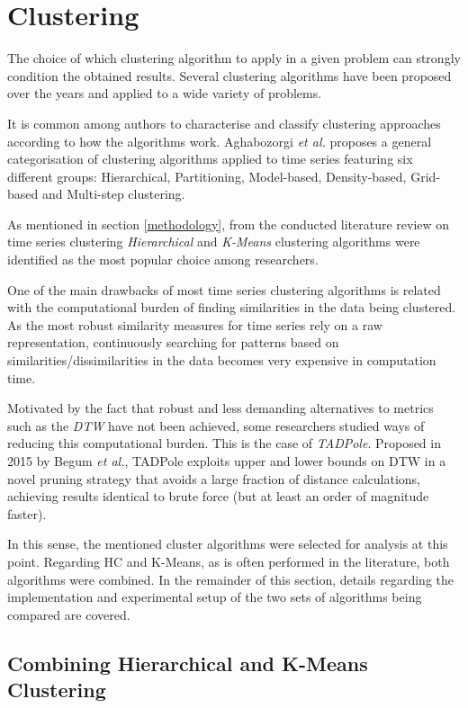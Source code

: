 \documentclass[9pt,journal,compsoc]{IEEEtran}
\begin{document}
\section{Clustering}

The choice of which clustering algorithm to apply in a given problem can strongly condition the obtained results. Several clustering algorithms have been proposed over the years and applied to a wide variety of problems.

It is common among authors to characterise and classify clustering approaches according to how the algorithms work. Aghabozorgi \emph{et al.}\cite{aghabozorgi2015time} proposes a general categorisation of clustering algorithms applied to time series featuring six different groups: Hierarchical, Partitioning, Model-based, Density-based, Grid-based and Multi-step clustering.

As mentioned in section \ref{methodology}, from the conducted literature review on time series clustering \emph{Hierarchical} and \emph{K-Means} clustering algorithms were identified as the most popular choice among researchers.

One of the main drawbacks of most time series clustering algorithms is related with the computational burden of finding similarities in the data being clustered. As the most robust similarity measures for time series rely on a raw representation, continuously searching for patterns based on similarities/dissimilarities in the data becomes very expensive in computation time.

Motivated by the fact that robust and less demanding alternatives to metrics such as the \emph{DTW} have not been achieved, some researchers studied ways of reducing this computational burden. This is the case of \emph{TADPole}\cite{begum2015accelerating}. Proposed in 2015 by Begum \emph{et al.}, TADPole exploits upper and lower bounds on DTW in a novel pruning strategy that avoids a large fraction of distance calculations, achieving results identical to brute force (but at least an order of magnitude faster).

In this sense, the mentioned cluster algorithms were selected for analysis at this point. Regarding HC and K-Means, as is often performed in the literature, both algorithms were combined\cite{jain2010data}. In the remainder of this section, details regarding the implementation and experimental setup of the two sets of algorithms being compared are covered.

\subsection{Combining Hierarchical and K-Means Clustering}
\end{document}
